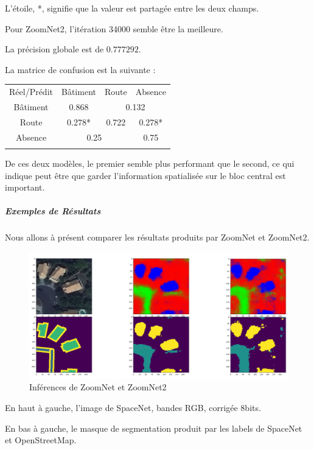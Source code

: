 \documentclass[a4paper, 11pt]{report}
\begin{document}
L'étoile, *, signifie que la valeur est partagée entre les deux champs.

Pour ZoomNet2, l'itération 34000 semble être la meilleure.

La précision globale est de $0.777292$.

La matrice de confusion est la suivante :
\begin{center}
	\begin{tabularx}{0.5\textwidth}{c|c c c|}
		Réel/Prédit & Bâtiment & Route & Absence \\
		\hhline{----}
		Bâtiment & 0.868 \cellcolor[gray]{.8} & \multicolumn{2}{c|}{0.132} \\
		Route & 0.278* & 0.722 \cellcolor[gray]{.8} & 0.278*\\
		Absence & \multicolumn{2}{c}{0.25} & 0.75 \cellcolor[gray]{.8}\\
		\hhline{~---}
	\end{tabularx}
\end{center}

De ces deux modèles, le premier semble plus performant que le second, ce qui indique peut être que garder l'information spatialisée sur le bloc central est important.
\subparagraph{Exemples de Résultats}
Nous allons à présent comparer les résultats produits par ZoomNet et ZoomNet2.

\begin{figure}[H]
	\begin{center}
		\includegraphics[scale=0.225]{Images/ZoomNets_1983.png}
		\caption{Inférences de ZoomNet et ZoomNet2}
	\end{center}
\end{figure}

En haut à gauche, l'image de SpaceNet, bandes RGB, corrigée 8bits.

En bas à gauche, le masque de segmentation produit par les labels de SpaceNet et OpenStreetMap.
\end{document}
